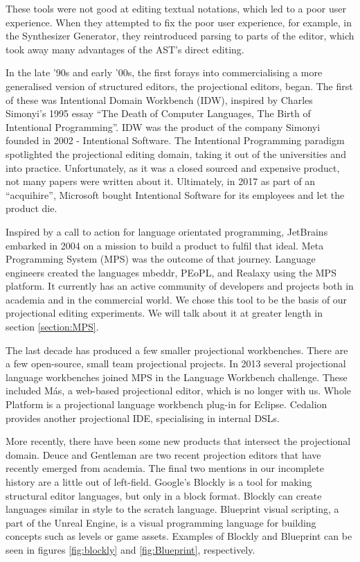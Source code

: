 These tools were not good at editing textual notations, which led to a poor user experience.
When they attempted to fix the poor user experience, for example, in the Synthesizer Generator, they reintroduced parsing to parts of the editor, which took away many advantages of the AST's direct editing.

In the late '90s and early '00s, the first forays into commercialising a more generalised version of structured editors, the projectional editors, began.
The first of these was Intentional Domain Workbench (IDW), inspired by Charles Simonyi's 1995 essay ``The Death of Computer Languages, The Birth of Intentional Programming''\cite{simonyi1995death}.
IDW was the product of the company Simonyi founded in 2002 - Intentional Software. 
The Intentional Programming paradigm spotlighted the projectional editing domain, taking it out of the universities and into practice.
Unfortunately, as it was a closed sourced and expensive product, not many papers were written about it.
Ultimately, in 2017 as part of an ``acquihire'', Microsoft bought Intentional Software for its employees and let the product die.

Inspired by a call to action for language orientated programming\cite{dmitriev2004language}, JetBrains embarked in 2004 on a mission to build a product to fulfil that ideal.  
Meta Programming System (MPS) was the outcome of that journey.   
Language engineers created the languages mbeddr, PEoPL, and Realaxy using the MPS platform.  
It currently has an active community of developers and projects both in academia and in the commercial world. 
We chose this tool to be the basis of our projectional editing experiments. 
We will talk about it at greater length in section \ref{section:MPS}.

The last decade has produced a few smaller projectional workbenches.
There are a few open-source, small team projectional projects. 
In 2013 several projectional language workbenches joined MPS in the Language Workbench challenge\cite{erdweg2015evaluating}.
These included M\'as, a web-based projectional editor, which is no longer with us\cite{MasPostMortem}.
Whole Platform\cite{WholePlatformProductPage} is a projectional language workbench plug-in for Eclipse.
Cedalion\cite{lorenz2011cedalion} provides another projectional IDE, specialising in internal DSLs.

More recently, there have been some new products that intersect the projectional domain.
Deuce\cite{hempel2018deuce} and Gentleman\cite{lafontant2020gentleman_SLR} are two recent projection editors that have recently emerged from academia.
The final two mentions in our incomplete history are a little out of left-field. 
Google's Blockly\cite{Blockly_ProductPage} is a tool for making structural editor languages, but only in a block format.
Blockly can create languages similar in style to the scratch language. 
Blueprint visual scripting, a part of the Unreal Engine, is a visual programming language for building concepts such as levels or game assets.
Examples of Blockly and Blueprint can be seen in figures \ref{fig:blockly} and \ref{fig:Blueprint}, respectively.

